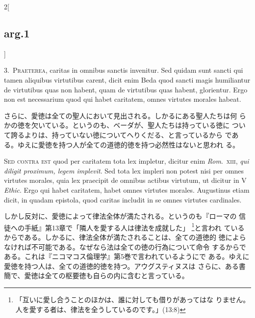 \documentclass[paper=a4paper,fontsize=10pt,jafontsize=9pt,titlepage]{jlreq}
\begin{document}
\begin{paracol}{2}[\subsection{arg.1}]

3.~{\scshape Praeterea}, caritas in omnibus sanctis invenitur. Sed
quidam sunt sancti qui tamen aliquibus virtutibus carent, dicit enim
Beda quod sancti magis humiliantur de virtutibus quas non habent, quam
de virtutibus quas habent, glorientur. Ergo non est necessarium quod
qui habet caritatem, omnes virtutes morales habeat.

\switchcolumn

さらに、愛徳は全ての聖人において見出される。しかるにある聖人たちは何
 らかの徳を欠いている。というのも、ベーダが、聖人たちは持っている徳に
 ついて誇るよりは、持っていない徳についてへりくだる、と言っているから
 である。ゆえに愛徳を持つ人が全ての道徳的徳を持つ必然性はないと思われ
 る。

\switchcolumn*[\subsection{s.c.}]

{\scshape Sed contra est} quod per caritatem tota lex impletur,
 dicitur enim {\itshape Rom}.~{\scshape xiii}, {\itshape qui diligit
 proximum, legem implevit}. Sed tota lex impleri non potest nisi per
 omnes virtutes morales, quia lex praecipit de omnibus actibus
 virtutum, ut dicitur in V {\itshape Ethic}. Ergo qui habet caritatem,
 habet omnes virtutes morales. Augustinus etiam dicit, in quadam
 epistola, quod caritas includit in se omnes virtutes cardinales.

\switchcolumn

しかし反対に、愛徳によって律法全体が満たされる。というのも『ローマの
 信徒への手紙』第13章で「隣人を愛する人は律法を成就した」
 \footnote{「互いに愛し合うことのほかは、誰に対しても借りがあってはな
 りません。人を愛する者は、律法を全うしているのです。」(13:8)}と言われ
 ているからである。しかるに、律法全体が満たされることは、全ての道徳的
 徳によらなければ不可能である。なぜなら法は全ての徳の行為について命令
 するからである。これは『ニコマコス倫理学』第5巻で言われているようにで
 ある。ゆえに愛徳を持つ人は、全ての道徳的徳を持つ。アウグスティヌスは
 さらに、ある書簡で、愛徳は全ての枢要徳も自らの内に含むと言っている。



\end{paracol}
\end{document}
